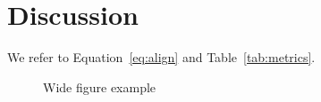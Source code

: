\section{Discussion}\label{sec:discussion}
We refer to Equation~\ref{eq:align} and Table~\ref{tab:metrics}.

\begin{figure}[htbp]
\centering
\fbox{\rule{0pt}{120pt}\rule{240pt}{0pt}}
\caption{Wide figure example}
\label{fig:wide}
\end{figure}
